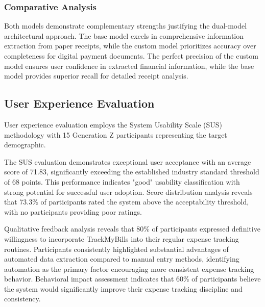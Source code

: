 \subsubsection{Comparative Analysis}
Both models demonstrate complementary strengths justifying the dual-model architectural approach. The base model excels in comprehensive information extraction from paper receipts, while the custom model prioritizes accuracy over completeness for digital payment documents. The perfect precision of the custom model ensures user confidence in extracted financial information, while the base model provides superior recall for detailed receipt analysis.

\subsection{User Experience Evaluation}
User experience evaluation employs the System Usability Scale (SUS) methodology with 15 Generation Z participants representing the target demographic.


The SUS evaluation demonstrates exceptional user acceptance with an average score of 71.83, significantly exceeding the established industry standard threshold of 68 points. This performance indicates "good" usability classification with strong potential for successful user adoption. Score distribution analysis reveals that 73.3\% of participants rated the system above the acceptability threshold, with no participants providing poor ratings.

Qualitative feedback analysis reveals that 80\% of participants expressed definitive willingness to incorporate TrackMyBills into their regular expense tracking routines. Participants consistently highlighted substantial advantages of automated data extraction compared to manual entry methods, identifying automation as the primary factor encouraging more consistent expense tracking behavior. Behavioral impact assessment indicates that 60\% of participants believe the system would significantly improve their expense tracking discipline and consistency.

